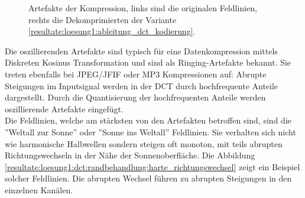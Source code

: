\begin{figure}[!htbp]
	\center
	\caption{Artefakte der Kompression, links sind die originalen Feldlinien, rechts die Dekomprimierten der Variante \ref{resultate:loesung1:ableitung_dct_kodierung}.}
	\label{resultate:loesung1:dct:randbehandlung:jvhartefakte_loesung6}
\end{figure}
Die oszillierenden Artefakte sind typisch für eine Datenkompression mittels Diskreten Kosinus Transformation und sind als Ringing-Artefakte \cite{wiki:ringing:artefacts} bekannt. Sie treten ebenfalls bei JPEG/JFIF oder MP3 Kompressionen auf: Abrupte Steigungen im Inputsignal werden in der DCT durch hochfrequente Anteile dargestellt. Durch die Quantisierung der hochfrequenten Anteile werden oszillierende Artefakte eingefügt.\\
Die Feldlinien, welche am stärksten von den Artefakten betroffen sind, sind die ''Weltall zur Sonne'' oder ''Sonne ins Weltall'' Feldlinien. Sie verhalten sich nicht wie harmonische Halbwellen sondern steigen oft monoton, mit teils abrupten Richtungswechseln in der Nähe der Sonnenoberfläche. Die Abbildung \ref{resultate:loesung1:dct:randbehandlung:harte_richtungswechsel} zeigt ein Beispiel solcher Feldlinien. Die abrupten Wechsel führen zu abrupten Steigungen in den einzelnen Kanälen.

